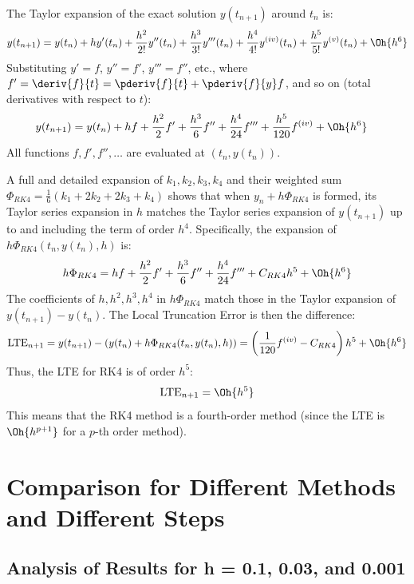 \documentclass{article}
\begin{document}
The Taylor expansion of the exact solution $y(t_{n+1})$ around $t_n$ is:
$$ y(t_{n+1}) = y(t_n) + h y'(t_n) + \frac{h^2}{2!} y''(t_n) + \frac{h^3}{3!} y'''(t_n) + \frac{h^4}{4!} y^{(iv)}(t_n) + \frac{h^5}{5!} y^{(v)}(t_n) + \Oh{h^6} $$
Substituting $y' = f$, $y'' = f'$, $y''' = f''$, etc., where $f' = \deriv{f}{t} = \pderiv{f}{t} + \pderiv{f}{y} f$, and so on (total derivatives with respect to $t$):
\begin{align*}
y(t_{n+1}) = y(t_n) + hf &+ \frac{h^2}{2}f' + \frac{h^3}{6}f'' + \frac{h^4}{24}f''' + \frac{h^5}{120}f^{(iv)} + \Oh{h^6} \label{eq:taylor_exact}
\end{align*}
All functions $f, f', f'', \dots$ are evaluated at $(t_n, y(t_n))$.


A full and detailed expansion of $k_1, k_2, k_3, k_4$ and their weighted sum $\Phi_{RK4} = \frac{1}{6}(k_1 + 2k_2 + 2k_3 + k_4)$ shows that when $y_n + h\Phi_{RK4}$ is formed, its Taylor series expansion in $h$ matches the Taylor series expansion of $y(t_{n+1})$ up to and including the term of order $h^4$.
Specifically, the expansion of $h\Phi_{RK4}(t_n, y(t_n), h)$ is:
$$ h\Phi_{RK4} = hf + \frac{h^2}{2}f' + \frac{h^3}{6}f'' + \frac{h^4}{24}f''' + C_{RK4}h^5 + \Oh{h^6} $$
The coefficients of $h, h^2, h^3, h^4$ in $h\Phi_{RK4}$ match those in the Taylor expansion of $y(t_{n+1}) - y(t_n)$.
The Local Truncation Error is then the difference:
$$ \text{LTE}_{n+1} = y(t_{n+1}) - (y(t_n) + h\Phi_{RK4}(t_n, y(t_n), h)) = \left(\frac{1}{120}f^{(iv)} - C_{RK4}\right)h^5 + \Oh{h^6} $$
Thus, the LTE for RK4 is of order $h^5$:
$$ \text{LTE}_{n+1} = \Oh{h^5} $$
This means that the RK4 method is a fourth-order method (since the LTE is $\Oh{h^{p+1}}$ for a $p$-th order method).








\section{Comparison for Different Methods and Different Steps}

\subsection{Analysis of Results for h = 0.1, 0.03, and 0.001}
\end{document}
